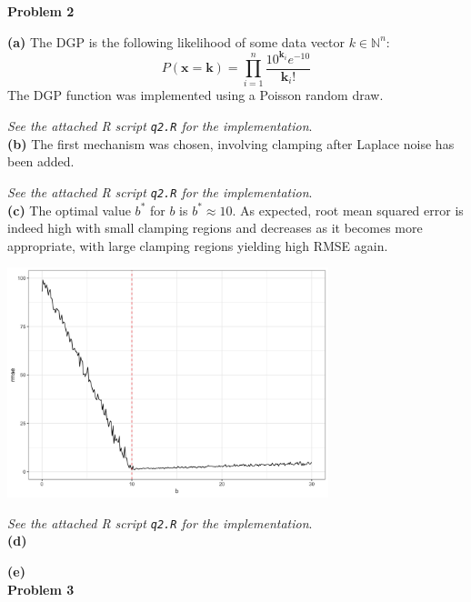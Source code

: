 \documentclass[12pt]{article}
\begin{document}
{\large\textbf{Problem 2}}

\textbf{(a)} The DGP is the following likelihood of some data vector $k\in\mathbb{N}^n$:
\[P(\mathbf{x} = \mathbf{k}) = \prod\limits^n_{i=1} \dfrac{10^{\mathbf{k}_i}e^{-10}}{\mathbf{k}_i!}\]
The DGP function was implemented using a Poisson random draw.

\emph{See the attached R script \texttt{q2.R} for the implementation}.\\

\textbf{(b)} The first mechanism was chosen, involving clamping after Laplace noise has been added.

\emph{See the attached R script \texttt{q2.R} for the implementation}.\\

\textbf{(c)} The optimal value $b^*$ for $b$ is $\boxed{b^* \approx 10}$. As expected, root mean squared error is indeed high with small clamping regions and decreases as it becomes more appropriate, with large clamping regions yielding high RMSE again.

\begin{center}
\includegraphics[width=0.7\textwidth]{clamping}
\end{center}

\emph{See the attached R script \texttt{q2.R} for the implementation}.\\

\textbf{(d)}

\textbf{(e)}\\

{\large\textbf{Problem 3}}
\end{document}
